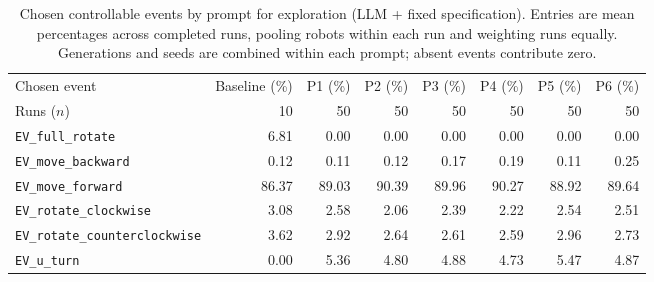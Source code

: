 \begin{table}[htbp]
\centering
\small
\caption{Chosen controllable events by prompt for exploration (LLM + fixed specification). Entries are mean percentages across completed runs, pooling robots within each run and weighting runs equally. Generations and seeds are combined within each prompt; absent events contribute zero.}
\label{tab:exploration-with-fixed-spec-prompt-events}
\begin{tabular}{lrrrrrrr}
\hline
Chosen event & Baseline (\%) & P1 (\%) & P2 (\%) & P3 (\%) & P4 (\%) & P5 (\%) & P6 (\%) \\
Runs ($n$) & 10 & 50 & 50 & 50 & 50 & 50 & 50 \\
\hline
\texttt{EV\_full\_rotate} & 6.81 & 0.00 & 0.00 & 0.00 & 0.00 & 0.00 & 0.00 \\
\texttt{EV\_move\_backward} & 0.12 & 0.11 & 0.12 & 0.17 & 0.19 & 0.11 & 0.25 \\
\texttt{EV\_move\_forward} & 86.37 & 89.03 & 90.39 & 89.96 & 90.27 & 88.92 & 89.64 \\
\texttt{EV\_rotate\_clockwise} & 3.08 & 2.58 & 2.06 & 2.39 & 2.22 & 2.54 & 2.51 \\
\texttt{EV\_rotate\_counterclockwise} & 3.62 & 2.92 & 2.64 & 2.61 & 2.59 & 2.96 & 2.73 \\
\texttt{EV\_u\_turn} & 0.00 & 5.36 & 4.80 & 4.88 & 4.73 & 5.47 & 4.87 \\
\hline
\end{tabular}
\end{table}
